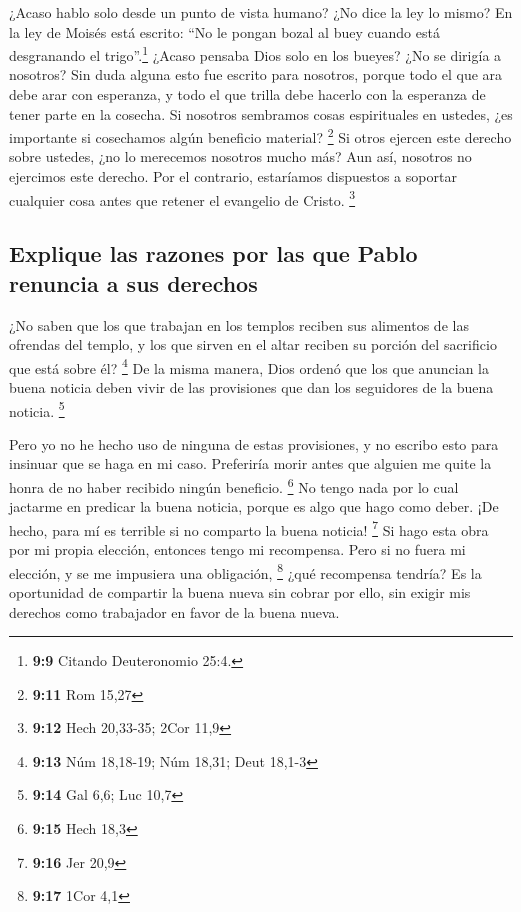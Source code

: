  ¿Acaso hablo solo desde un punto de vista humano? ¿No
dice la ley lo mismo?  En la ley de Moisés está escrito:
``No le pongan bozal al buey cuando está desgranando el
trigo''.\footnote{\textbf{9:9} Citando Deuteronomio 25:4.} ¿Acaso
pensaba Dios solo en los bueyes?  ¿No se dirigía a
nosotros? Sin duda alguna esto fue escrito para nosotros, porque todo el
que ara debe arar con esperanza, y todo el que trilla debe hacerlo con
la esperanza de tener parte en la cosecha.  Si nosotros
sembramos cosas espirituales en ustedes, ¿es importante si cosechamos
algún beneficio material? \footnote{\textbf{9:11} Rom 15,27}
 Si otros ejercen este derecho sobre ustedes, ¿no lo
merecemos nosotros mucho más? Aun así, nosotros no ejercimos este
derecho. Por el contrario, estaríamos dispuestos a soportar cualquier
cosa antes que retener el evangelio de Cristo. \footnote{\textbf{9:12}
  Hech 20,33-35; 2Cor 11,9}

\hypertarget{explique-las-razones-por-las-que-pablo-renuncia-a-sus-derechos}{%
\subsection{Explique las razones por las que Pablo renuncia a sus
derechos}\label{explique-las-razones-por-las-que-pablo-renuncia-a-sus-derechos}}

 ¿No saben que los que trabajan en los templos reciben
sus alimentos de las ofrendas del templo, y los que sirven en el altar
reciben su porción del sacrificio que está sobre él? \footnote{\textbf{9:13}
  Núm 18,18-19; Núm 18,31; Deut 18,1-3}  De la misma
manera, Dios ordenó que los que anuncian la buena noticia deben vivir de
las provisiones que dan los seguidores de la buena noticia. \footnote{\textbf{9:14}
  Gal 6,6; Luc 10,7}

 Pero yo no he hecho uso de ninguna de estas provisiones,
y no escribo esto para insinuar que se haga en mi caso. Preferiría morir
antes que alguien me quite la honra de no haber recibido ningún
beneficio. \footnote{\textbf{9:15} Hech 18,3}  No tengo
nada por lo cual jactarme en predicar la buena noticia, porque es algo
que hago como deber. ¡De hecho, para mí es terrible si no comparto la
buena noticia! \footnote{\textbf{9:16} Jer 20,9}  Si hago
esta obra por mi propia elección, entonces tengo mi recompensa. Pero si
no fuera mi elección, y se me impusiera una obligación, \footnote{\textbf{9:17}
  1Cor 4,1}  ¿qué recompensa tendría? Es la oportunidad
de compartir la buena nueva sin cobrar por ello, sin exigir mis derechos
como trabajador en favor de la buena nueva.

